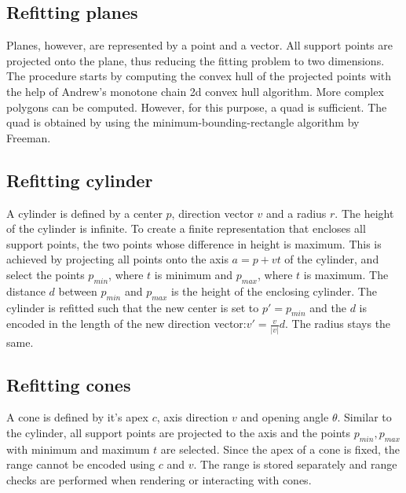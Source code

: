\subsection{Refitting planes}
Planes, however, are represented by a point and a vector. All support points are projected onto the plane, thus reducing the fitting problem to two dimensions. The procedure starts by computing the convex hull of the projected points with the help of Andrew's monotone chain 2d convex hull algorithm\cite{andrew1979another}. 
More complex polygons can be computed. However, for this purpose, a quad is sufficient. The quad is obtained by using the minimum-bounding-rectangle algorithm by Freeman\cite{freeman1975determining}. 

\subsection{Refitting cylinder}
A cylinder is defined by a center $p$, direction vector $v$ and a radius $r$. The height of the cylinder is infinite. To create a finite representation that encloses all support points, the two points whose difference in height is maximum. This is achieved by projecting all points onto the axis $a = p + vt$ of the cylinder, and select the points $p_{min}$, where $t$ is minimum and $p_{max}$, where $t$ is maximum. The distance $d$ between $p_{min}$ and $p_{max}$ is the height of the enclosing cylinder. The cylinder is refitted such that the new center is set to $p' = p_{min}$ and the $d$ is encoded in the length of the new direction vector:$v' = \frac{v}{|v|}d$. The radius stays the same. 

\subsection{Refitting cones}
A cone is defined by it's apex $c$, axis direction $v$ and opening angle $\theta$. Similar to the cylinder, all support points are projected to the axis and the points $p_{min}, p_{max}$ with minimum and maximum $t$ are selected. Since the apex of a cone is fixed, the range cannot be encoded using $c$ and $v$. The range is stored separately and range checks are performed when rendering or interacting with cones. 





